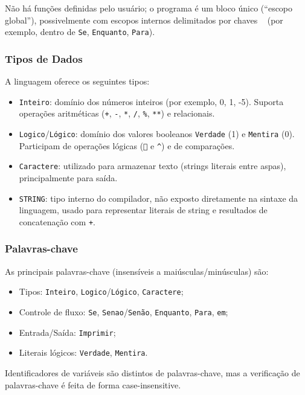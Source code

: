 \documentclass[12pt,a4paper]{article}
\begin{document}
Não há funções definidas pelo usuário; o programa é um bloco único (``escopo global''), possivelmente com escopos internos delimitados por chaves \texttt{{} } (por exemplo, dentro de \texttt{Se}, \texttt{Enquanto}, \texttt{Para}).

\subsubsection*{Tipos de Dados}

A linguagem oferece os seguintes tipos:

\begin{itemize}
  \item \texttt{Inteiro}: domínio dos números inteiros (por exemplo, 0, 1, -5). Suporta operações aritméticas (\texttt{+}, \texttt{-}, \texttt{*}, \texttt{/}, \texttt{\%}, \texttt{**}) e relacionais.
  \item \texttt{Logico}/\texttt{Lógico}: domínio dos valores booleanos \texttt{Verdade} (1) e \texttt{Mentira} (0). Participam de operações lógicas (\texttt{} e \texttt{^}) e de comparações.
  \item \texttt{Caractere}: utilizado para armazenar texto (strings literais entre aspas), principalmente para saída.
  \item \texttt{STRING}: tipo interno do compilador, não exposto diretamente na sintaxe da linguagem, usado para representar literais de string e resultados de concatenação com \texttt{+}.
\end{itemize}

\subsubsection*{Palavras-chave}

As principais palavras-chave (insensíveis a maiúsculas/minúsculas) são:

\begin{itemize}
  \item Tipos: \texttt{Inteiro}, \texttt{Logico}/\texttt{Lógico}, \texttt{Caractere};
  \item Controle de fluxo: \texttt{Se}, \texttt{Senao}/\texttt{Senão}, \texttt{Enquanto}, \texttt{Para}, \texttt{em};
  \item Entrada/Saída: \texttt{Imprimir};
  \item Literais lógicos: \texttt{Verdade}, \texttt{Mentira}.
\end{itemize}

Identificadores de variáveis são distintos de palavras-chave, mas a verificação de palavras-chave é feita de forma case-insensitive.
\end{document}
